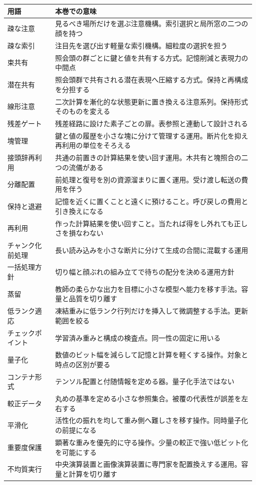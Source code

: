 \documentclass[lualatex,a4paper,10pt]{jlreq}
\begin{document}
\begin{tabular}{@{}p{}p{}@{}}
\toprule
用語 & 本巻での意味 \\
\midrule
疎な注意 & 見るべき場所だけを選ぶ注意機構。索引選択と局所窓の二つの顔を持つ \\
疎な索引 & 注目先を選び出す軽量な索引機構。細粒度の選択を担う \\
束共有 & 照会頭の群ごとに鍵と値を共有する方式。記憶削減と表現力の中間点 \\
潜在共有 & 照会頭群で共有される潜在表現へ圧縮する方式。保持と再構成を分担する \\
線形注意 & 二次計算を漸化的な状態更新に置き換える注意系列。保持形式そのものを変える \\
残差ゲート & 残差経路に設けた素子ごとの扉。表参照と連動して設計される \\
塊管理 & 鍵と値の履歴を小さな塊に分けて管理する運用。断片化を抑え再利用の単位をそろえる \\
接頭辞再利用 & 共通の前置きの計算結果を使い回す運用。木共有と塊照合の二つの流儀がある \\
分離配置 & 前処理と復号を別の資源溜まりに置く運用。受け渡し転送の費用を伴う \\
保持と退避 & 記憶を近くに置くことと遠くに預けること。呼び戻しの費用と引き換えになる \\
再利用 & 作った計算結果を使い回すこと。当たれば得をし外れても正しさを損なわない \\
チャンク化前処理 & 長い読み込みを小さな断片に分けて生成の合間に混載する運用 \\
一括処理方針 & 切り幅と顔ぶれの組み立てで待ちの配分を決める運用方針 \\
蒸留 & 教師の柔らかな出力を目標に小さな模型へ能力を移す手法。容量と品質を切り離す \\
低ランク適応 & 凍結重みに低ランク行列だけを挿入して微調整する手法。更新範囲を絞る \\
チェックポイント & 学習済み重みと構成の検査点。同一性の固定に用いる \\
量子化 & 数値のビット幅を減らして記憶と計算を軽くする操作。対象と時点の区別が要る \\
コンテナ形式 & テンソル配置と付随情報を定める器。量子化手法ではない \\
較正データ & 丸めの基準を定める小さな参照集合。被覆の代表性が誤差を左右する \\
平滑化 & 活性化の振れを均して重み側へ難しさを移す操作。同時量子化の前提になる \\
重要度保護 & 顕著な重みを優先的に守る操作。少量の較正で強い低ビット化を可能にする \\
不均質実行 & 中央演算装置と画像演算装置に専門家を配置換えする運用。容量と計算を切り離す \\
\bottomrule
\end{tabular}
\normalsize
\end{document}
